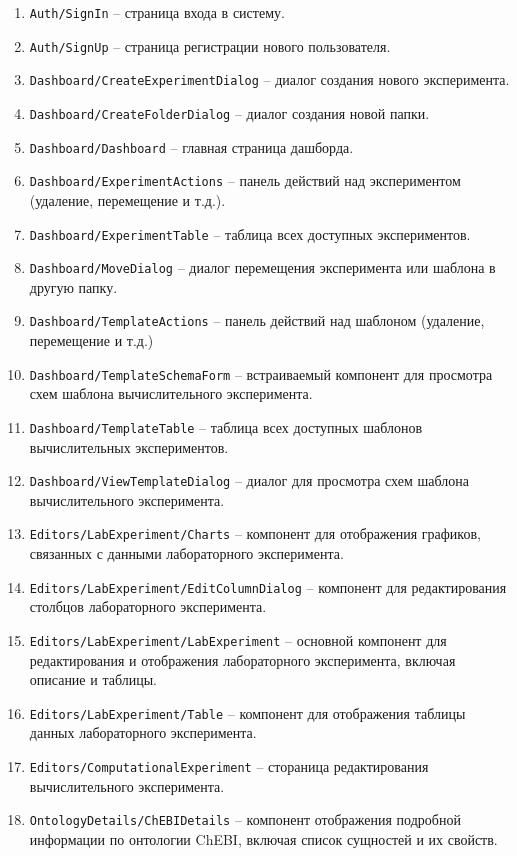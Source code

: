 \begin{enumerate}
\item \texttt{Auth/SignIn} -- страница входа в систему.
\item \texttt{Auth/SignUp} -- страница регистрации нового пользователя.
\item \texttt{Dashboard/CreateExperimentDialog} -- диалог создания нового эксперимента.
\item \texttt{Dashboard/CreateFolderDialog} -- диалог создания новой папки.
\item \texttt{Dashboard/Dashboard} -- главная страница дашборда.
\item \texttt{Dashboard/ExperimentActions} -- панель действий над экспериментом (удаление, перемещение и т.д.).
\item \texttt{Dashboard/ExperimentTable} -- таблица всех доступных экспериментов.
\item \texttt{Dashboard/MoveDialog} -- диалог перемещения эксперимента или шаблона в другую папку.
\item \texttt{Dashboard/TemplateActions} -- панель действий над шаблоном (удаление, перемещение и т.д.)
\item \texttt{Dashboard/TemplateSchemaForm} -- встраиваемый компонент для просмотра схем шаблона вычислительного эксперимента.
\item \texttt{Dashboard/TemplateTable} -- таблица всех доступных шаблонов вычислительных экспериментов.
\item \texttt{Dashboard/ViewTemplateDialog} -- диалог для просмотра схем шаблона вычислительного эксперимента.
\item \texttt{Editors/LabExperiment/Charts} -- компонент для отображения графиков, связанных с данными лабораторного эксперимента.
\item \texttt{Editors/LabExperiment/EditColumnDialog} -- компонент для редактирования столбцов лабораторного эксперимента.
\item \texttt{Editors/LabExperiment/LabExperiment} -- основной компонент для редактирования и отображения лабораторного эксперимента, включая описание и таблицы.
\item \texttt{Editors/LabExperiment/Table} -- компонент для отображения таблицы данных лабораторного эксперимента.
\item \texttt{Editors/ComputationalExperiment} -- стораница редактирования вычислительного эксперимента.
\item \texttt{OntologyDetails/ChEBIDetails} -- компонент отображения подробной информации по онтологии ChEBI, включая список сущностей и их свойств.

\end{enumerate}
